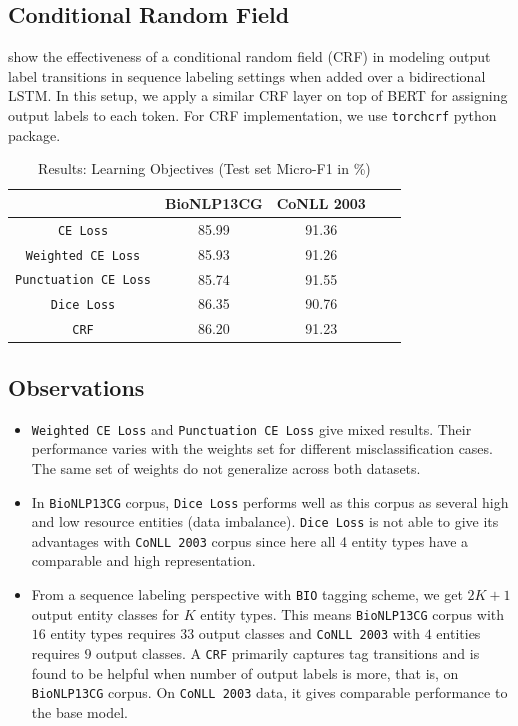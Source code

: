 \subsection{Conditional Random Field}
\cite{ma2016end} show the effectiveness of a conditional random field (CRF) in modeling output label transitions in sequence labeling settings when added over a bidirectional LSTM. In this setup, we apply a similar CRF layer on top of BERT for assigning output labels to each token. For CRF implementation, we use \texttt{torchcrf} python package.

\begin{table}[h!]
\centering
\begin{tabular}{|c|c|c|c|c|}\hline
	\textbf{} & \textbf{BioNLP13CG} & \textbf{CoNLL 2003}\\\hline
	\texttt{CE Loss} & 85.99 & 91.36\\\hline
	\texttt{Weighted CE Loss} & 85.93 & 91.26\\\hline
	\texttt{Punctuation CE Loss} & 85.74 & 91.55\\\hline
	\texttt{Dice Loss} & 86.35 & 90.76\\\hline
	\texttt{CRF} & 86.20 & 91.23\\\hline
	\end{tabular}
    \caption{Results: Learning Objectives (Test set Micro-F1 in \%)}
    \label{tab:res_loss}
\end{table}

\subsection{Observations}
\begin{itemize}
    \item \texttt{Weighted CE Loss} and \texttt{Punctuation CE Loss} give mixed results. Their performance varies with the weights set for different misclassification cases. The same set of weights do not generalize across both datasets.
    
    \item In \texttt{BioNLP13CG} corpus, \texttt{Dice Loss} performs well as this corpus as several high and low resource entities (data imbalance). \texttt{Dice Loss} is not able to give its advantages with \texttt{CoNLL 2003} corpus since here all 4 entity types have a comparable and high representation.
    
    \item From a sequence labeling perspective with \texttt{BIO} tagging scheme, we get $2K + 1$ output entity classes for $K$ entity types. This means \texttt{BioNLP13CG} corpus with $16$ entity types requires $33$ output classes and \texttt{CoNLL 2003} with $4$ entities requires $9$ output classes. A \texttt{CRF} primarily captures tag transitions and is found to be helpful when number of output labels is more, that is, on \texttt{BioNLP13CG} corpus. On \texttt{CoNLL 2003} data, it gives comparable performance to the base model.
\end{itemize}


